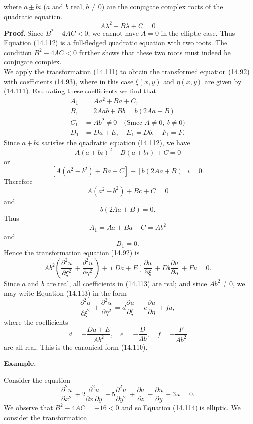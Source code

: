 \documentclass[11pt,a4paper, twoside]{report}
\newcommand{\pf}[2]{\dfrac{\partial #1}{\partial #2}\,}
\newcommand{\pfn}[3]{\dfrac{\partial^#3 #1}{\partial #2^#3}\,}
\newcommand{\pfp}[4]{\dfrac{\partial^#4 #1}{\partial #2\ \partial #3}\,}
\begin{document}
	\textit{}{where $a \pm bi$ ($a$ and $b$ real, $b\neq 0$) are the conjugate complex roots of the quadratic equation.}
	\begin{equation}\tag{14.112}
		A\lambda^2 + B\lambda + C = 0
	\end{equation}
	\textbf{Proof.} Since $B^2 - 4AC < 0$, we cannot  have  $A = 0$ in  the elliptic case. Thus  Equation (14.112) is a full-fledged quadratic equation with two roots. The condition $B^2 - 4AC < 0$ further shows that these two roots must indeed be conjugate complex.\\
	We apply the transformation (14.111) to obtain the transformed equation (14.92) with  coefficients (14.93), where in this case $\xi(x, y)$ and $\eta(x,y)$ are given by (14.111).  Evaluating these coefficients we find that
	\begin{align*}
		A_1 &= Aa^2 + Ba + C,\\
		B_1 &= 2Aab + Bb = b(2Aa + B)\\
		C_1 &= Ab^2 \neq 0\quad \text{(Since $A \neq 0,\ b\neq 0$)}\\
		D_1 &= Da + E,\quad E_1 = Db,\quad F_1 = F.
	\end{align*}
	Since $a + bi$ satisfies the quadratic equation (14.112), we have
	$$
	A(a + bi)^2 + B(a + bi) + C = 0
	$$
	or
	$$
	[A(a^2 - b^2) + Ba + C] + [b(2Aa + B)]i = 0.
	$$
	Therefore
	$$
	A(a^2 - b^2) + Ba + C = 0
	$$
	and
	$$
	b(2Aa + B) = 0.
	$$
	Thus
	$$
	A_1 = Aa + Ba + C = Ab^2
	$$
	and
	$$
	B_1 = 0.
	$$
	Hence the transformation equation (14.92) is
	\begin{equation}\tag{14.113}
		Ab^2\left(\pfn{u}{\xi}{2} + \pfn{u}{\eta}{2}\right) + (Da + E)\pf{u}{\xi} + Db\pf{u}{\eta} + Fu = 0.
	\end{equation}
	Since $a$ and $b$ are real, all coefficients in (14.113) are real; and since $Ab^2 \neq 0$, we may write Equation (14.113) in the form
	$$
	\pfn{u}{\xi}{2} + \pfn{u}{\eta}{2} = d\pf{u}{\xi} + e\pf{u}{\eta} + fu,
	$$
	where the coefficients
	$$
	d = -\frac{Da + E}{Ab^2},\quad e = -\frac{D}{Ab},\quad f = -\frac{F}{Ab^2}
	$$
	are all real. This is the canonical form (14.110).\par
	\textbf{Example.}\par
	Consider the equation
	\begin{equation}\tag{14.114}
		\pfn{u}{x}{2} + 2\pfp{u}{x}{y}{2} + 5\pfn{u}{y}{2} + \pf{u}{z}  - \pf{u}{y} - 3u = 0.
	\end{equation}
	We observe  that $B^2 - 4AC = -16 < 0$ and  so Equation (14.114) is elliptic. We consider the transformation
\end{document}
